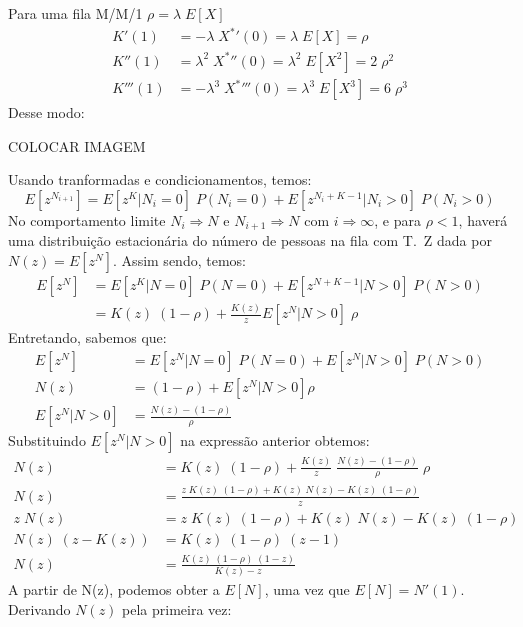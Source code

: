 \documentclass[a4paper]{article}
\newcommand{\E}[1]{E\!\left[#1\right]}
\begin{document}
Para uma fila M/M/1 \(\rho = \lambda \; \E{X}\)
\begin{align*}
    K'(1) &= -\lambda \; {X^*}'(0) = \lambda \; \E{X}
        = \rho \\
    K''(1) &= \lambda^2 \; {X^*}''(0)
        = \lambda^2 \; \E{X^2} = 2 \; \rho^2 \\
    K'''(1) &= - \lambda^3 \; {X^*}'''(0)
        = \lambda^3 \; \E{X^3} = 6 \; \rho^3
\end{align*}
Desse modo:
\begin{center}
    COLOCAR IMAGEM
\end{center}
Usando tranformadas e condicionamentos, temos:
\[
    \E{z^{N_{i+1}}}
        = \E{z^{K} | N_i = 0} \; P(N_i = 0)
        + \E{z^{N_{i}+K-1} | N_i > 0} \; P(N_i > 0)
\]
No comportamento limite
\(N_i \Rightarrow N\) e \(N_{i+1} \Rightarrow N\)
com \(i \Rightarrow \infty\),
e para \(\rho < 1 \),
haverá uma distribuição estacionária
do número de pessoas na fila com T.~Z dada por
\(N(z) = \E{z^N}\).
Assim sendo, temos:
\begin{align*}
    \E{z^N} &= \E{z^K | N = 0} \; P(N = 0)
        + \E{z^{N+K-1} | N>0} \; P(N > 0) \\
    &= K(z) \; (1 - \rho)
        + \frac{K(z)}{z} \E{z^N | N > 0} \; \rho
\end{align*}
Entretando, sabemos que:
\begin{align*}
    \E{z^N} &= \E{z^N| N = 0} \; P(N = 0)
        + \E{z^N  | N > 0} \; P(N > 0) \\
    N(z) &= (1 - \rho) + \E{z^N | N > 0} \rho \\
    \E{z^N | N > 0} &= \frac{N(z) - (1 - \rho)}{\rho}
\end{align*}
Substituindo \(\E{z^N | N > 0}\)
na expressão anterior obtemos:
\begin{align*}
    N(z) &= K(z) \; (1 - \rho)
        + \frac{K(z)}{z} \; \frac{N(z) - (1 - \rho)}{\rho}
        \; \rho \\
    N(z) &= \frac{z \; K(z) \; (1 - \rho)
        + K(z) \; N(z) - K(z) \; (1 - \rho)}{z} \\
    z \; N(z) &= z \; K(z) \; (1 - \rho)
        + K(z) \; N(z) - K(z) \; (1 - \rho) \\
    N(z) \; (z - K(z)) &= K(z) \; (1 - \rho) \; (z - 1) \\
    N(z) &= \frac{K(z) \; (1 - \rho) \; (1 - z)}{K(z) - z}
\end{align*}
A partir de N(z),
podemos obter a \(\E{N}\),
uma vez que \(\E{N} = N'(1)\).
Derivando \(N(z)\) pela primeira vez:
\end{document}
